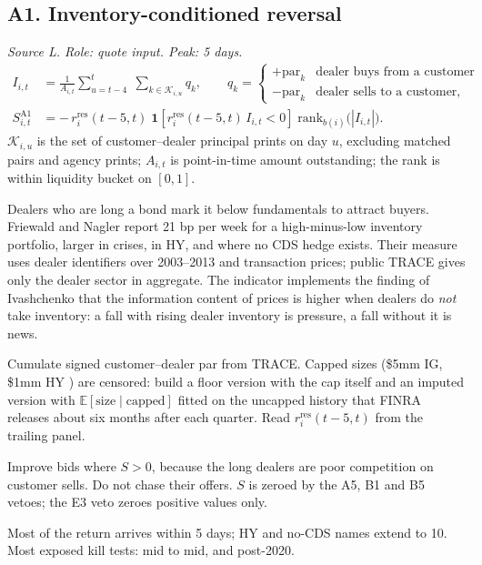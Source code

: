 \documentclass[11pt,letterpaper]{article}
\newcommand{\E}{\mathbb{E}}
\newcommand{\ind}[1]{\mathbf{1}\!\left[#1\right]}
\newcommand{\rres}{r^{\mathrm{res}}}      %
\begin{document}
\subsection{A1. Inventory-conditioned reversal}
\emph{Source L. Role: quote input. Peak: 5 days.}
\begin{align}
I_{i,t} &= \frac{1}{A_{i,t}}\sum_{u=t-4}^{t}\;\sum_{k\in\mathcal{K}_{i,u}} q_k,
\qquad q_k=\begin{cases}+\mathrm{par}_k & \text{dealer buys from a customer}\\ -\mathrm{par}_k & \text{dealer sells to a customer,}\end{cases}\\[2pt]
S^{\mathrm{A1}}_{i,t} &= -\,\rres_i(t-5,t)\;\ind{\rres_i(t-5,t)\,I_{i,t}<0}\;\mathrm{rank}_{b(i)}\bigl(|I_{i,t}|\bigr).
\end{align}
$\mathcal{K}_{i,u}$ is the set of customer--dealer principal prints on day $u$, excluding matched pairs and agency prints; $A_{i,t}$ is point-in-time amount outstanding; the rank is within liquidity bucket on $[0,1]$.
\begin{spec}
\item[Mechanism and evidence.] Dealers who are long a bond mark it below fundamentals to attract buyers. Friewald and Nagler \cite{fn2024} report 21 bp per week for a high-minus-low inventory portfolio, larger in crises, in HY, and where no CDS hedge exists. Their measure uses dealer identifiers over 2003--2013 and transaction prices; public TRACE gives only the dealer sector in aggregate. The indicator implements the finding of Ivashchenko \cite{iva2024} that the information content of prices is higher when dealers do \emph{not} take inventory: a fall with rising dealer inventory is pressure, a fall without it is news.
\item[Build.] Cumulate signed customer--dealer par from TRACE. Capped sizes (\$5mm IG, \$1mm HY \cite{finra}) are censored: build a floor version with the cap itself and an imputed version with $\E[\text{size}\mid\text{capped}]$ fitted on the uncapped history that FINRA releases about six months after each quarter. Read $\rres_i(t-5,t)$ from the trailing panel.
\item[Role in the quote.] Improve bids where $S>0$, because the long dealers are poor competition on customer sells. Do not chase their offers. $S$ is zeroed by the A5, B1 and B5 vetoes; the E3 veto zeroes positive values only.
\item[Decay and pitfalls.] Most of the return arrives within 5 days; HY and no-CDS names extend to 10. Most exposed kill tests: mid to mid, and post-2020.
\end{spec}
\end{document}
